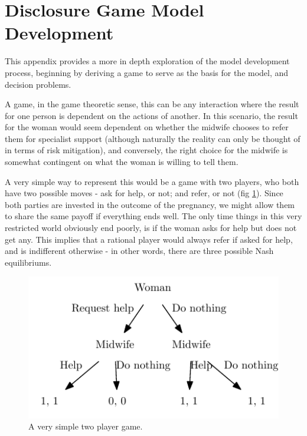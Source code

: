 \section{Disclosure Game Model Development}
\label{app:model_description}

This appendix provides a more in depth exploration of the model development process, beginning by deriving a game to serve as the basis for the model, and decision problems.

A game, in the game theoretic sense, this can be any interaction where the result for one person is dependent on the actions of another. In this scenario, the result for the woman would seem dependent on whether the midwife chooses to refer them for specialist support (although naturally the reality can only be thought of in terms of risk mitigation), and conversely, the right choice for the midwife is somewhat contingent on what the woman is willing to tell them.

A very simple way to represent this would be a game with two players, who both have two possible moves - ask for help, or not; and refer, or not (fig \ref{fig:simplest_game}). Since both parties are invested in the outcome of the pregnancy, we might allow them to share the same payoff if everything ends well. The only time things in this very restricted world obviously end poorly, is if the woman asks for help but does not get any. This implies that a rational player would always refer if asked for help, and is indifferent otherwise - in other words, there are three possible Nash equilibriums.


\begin{figure}[H]
\begin{adjustbox}{center}
\includegraphics[width=119mm]{figures/simplest_game}
\end{adjustbox}
\caption{A very simple two player game.}

\label{fig:simplest_game}
\end{figure}

